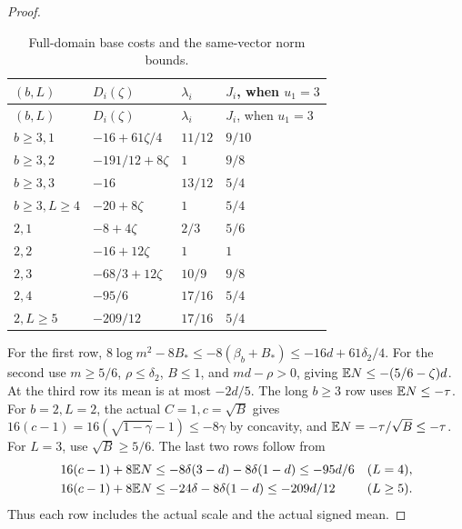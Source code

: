 \begin{proof}
\begingroup\small
\setlength{\tabcolsep}{4pt}
\begin{longtable}{@{}llll@{}}
\caption{Full-domain base costs and the same-vector norm bounds.}
\label{tab:root-post:budgets}\\
\toprule
\((b,L)\)&\(D_i(\zeta)\)&\(\lambda_i\)&\(J_i\), when \(u_1=3\)\\
\midrule\endfirsthead
\toprule
\((b,L)\)&\(D_i(\zeta)\)&\(\lambda_i\)&\(J_i\), when \(u_1=3\)\\
\midrule\endhead
\bottomrule\endfoot
\(b\ge3,1\)&\(-16+61\zeta/4\)&\(11/12\)&\(9/10\)\\
\(b\ge3,2\)&\(-191/12+8\zeta\)&\(1\)&\(9/8\)\\
\(b\ge3,3\)&\(-16\)&\(13/12\)&\(5/4\)\\
\(b\ge3,L\ge4\)&\(-20+8\zeta\)&\(1\)&\(5/4\)\\
\(2,1\)&\(-8+4\zeta\)&\(2/3\)&\(5/6\)\\
\(2,2\)&\(-16+12\zeta\)&\(1\)&\(1\)\\
\(2,3\)&\(-68/3+12\zeta\)&\(10/9\)&\(9/8\)\\
\(2,4\)&\(-95/6\)&\(17/16\)&\(5/4\)\\
\(2,L\ge5\)&\(-209/12\)&\(17/16\)&\(5/4\)\\
\end{longtable}
\endgroup

For the first row, \(8\log m^2-8B_*
\le-8(\beta_b+B_*)\le-16d+61\delta_2/4\).
For the second use \(m\ge5/6\), \(\rho\le\delta_2\), \(B\le1\),
and \(md-\rho>0\), giving \(\mathbb E N\le-(5/6-\zeta)d\).
At the third row its mean is at most \(-2d/5\).
The long \(b\ge3\) row uses \(\mathbb E N\le-\tau\).
For \(b=2,L=2\), the actual \(C=1,c=\sqrt B\) gives
\(16(c-1)=16(\sqrt{1-\gamma}-1)\le-8\gamma\) by concavity,
and \(\mathbb E N=-\tau/\sqrt B\le-\tau\).
For \(L=3\), use \(\sqrt B\ge5/6\).
The last two rows follow from
\[
 \begin{aligned}
16(c-1)+8\mathbb E N
 &\le-8\delta(3-d)-8\delta(1-d)
 \le-95d/6 &&(L=4),\\
16(c-1)+8\mathbb E N
 &\le-24\delta-8\delta(1-d)
 \le-209d/12 &&(L\ge5).
 \end{aligned}
\]
Thus each row includes the actual scale and the actual signed mean.


\end{proof}
